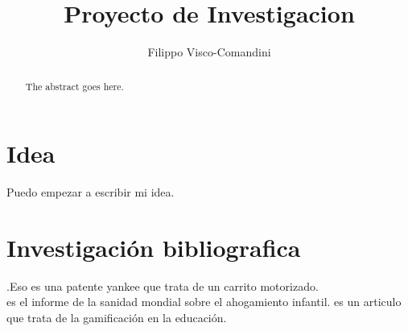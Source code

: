\documentclass[journal]{IEEEtran}
\begin{document}
\title{Proyecto de Investigacion}

\author{Filippo Visco-Comandini}

\maketitle

\begin{abstract}
The abstract goes here.
\end{abstract}
\section{Idea}
Puedo empezar a escribir mi idea.

\cite{nahmias2004models}

\section{Investigación bibliografica}

\cite{voeks1970self}.Eso es una patente yankee que trata de un carrito motorizado.\\
\cite{OMS2018} es el informe de la sanidad mondial sobre el ahogamiento infantil.
\cite{ayoup2022achievement} es un articulo que trata de la gamificación en la educación.




\end{document}
